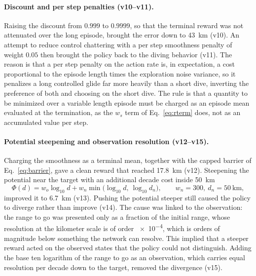 \documentclass[11pt]{article}
\begin{document}
\paragraph{Discount and per step penalties (v10--v11).} Raising the discount from $0.999$ to $0.9999$, so that the terminal reward was not attenuated over the long episode, brought the error down to \SI{43}{\kilo\meter} (v10). An attempt to reduce control chattering with a per step smoothness penalty of weight $0.05$ then brought the policy back to the diving behavior (v11). The reason is that a per step penalty on the action rate is, in expectation, a cost proportional to the episode length times the exploration noise variance, so it penalizes a long controlled glide far more heavily than a short dive, inverting the preference of both and choosing on the short dive. The rule is that a quantity to be minimized over a variable length episode must be charged as an episode mean evaluated at the termination, as the $w_s$ term of Eq.~\eqref{eq:rterm} does, not as an accumulated value per step.

\paragraph{Potential steepening and observation resolution (v12--v15).} Charging the smoothness as a terminal mean, together with the capped barrier of Eq.~\eqref{eq:barrier}, gave a clean reward that reached \SI{17.8}{\kilo\meter} (v12). Steepening the potential near the target with an additional decade cost inside \SI{50}{\kilo\meter}
\begin{equation}
\Phi(d) = w_o \log_{10} d + w_n \min\!\big(\log_{10} d,\ \log_{10} d_n\big), \qquad w_n = 300,\ d_n = \SI{50}{\kilo\meter},
\label{eq:phi_shelf}
\end{equation}
improved it to \SI{6.7}{\kilo\meter} (v13). Pushing the potential steeper still caused the policy to diverge rather than improve (v14). The cause was linked to the observation: the range to go was presented only as a fraction of the initial range, whose resolution at the kilometer scale is of order \num{e-4}, which is orders of magnitude below something the network can resolve. This implied that a steeper reward acted on the observed states that the policy could not distinguish. Adding the base ten logarithm of the range to go as an observation, which carries equal resolution per decade down to the target, removed the divergence (v15).
\end{document}
